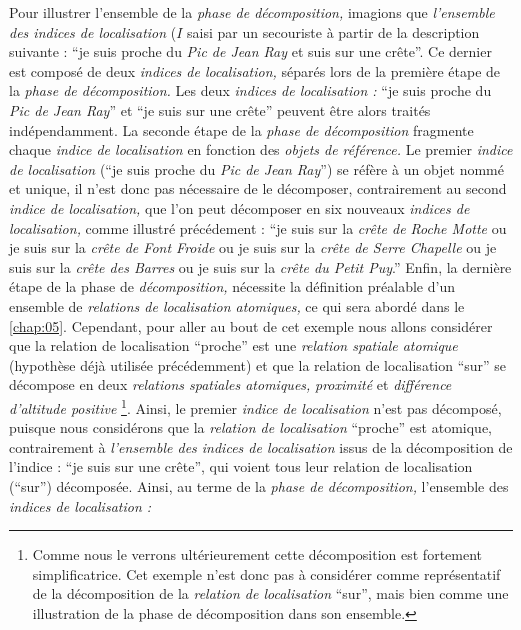 Pour illustrer l'ensemble de la \emph{phase de décomposition,}
imagions que \emph{l'ensemble des indices de localisation} (\(I\)
saisi par un secouriste à partir de la description suivante :
\enquote{je suis proche du \emph{Pic de Jean Ray} et suis sur une
  crête}. Ce dernier est composé de deux \emph{indices de
  localisation,} séparés lors de la première étape de la \emph{phase
  de décomposition.} Les deux \emph{indices de localisation :}
\enquote{je suis proche du \emph{Pic de Jean Ray}} et \enquote{je suis
  sur une crête} peuvent être alors traités indépendamment. La seconde
étape de la \emph{phase de décomposition} fragmente chaque
\emph{indice de localisation} en fonction des \emph{objets de
  référence.} Le premier \emph{indice de localisation} (\enquote{je
  suis proche du \emph{Pic de Jean Ray}}) se réfère à un objet nommé
et unique, il n'est donc pas nécessaire de le décomposer,
contrairement au second \emph{indice de localisation,} que l'on peut
décomposer en six nouveaux \emph{indices de localisation,} comme
illustré précédement : \enquote{je suis sur la \emph{crête de Roche
    Motte} ou je suis sur la \emph{crête de Font Froide} ou je suis
  sur la \emph{crête de Serre Chapelle} ou je suis sur la \emph{crête
    des Barres} ou je suis sur la \emph{crête du Petit Puy}.} Enfin,
la dernière étape de la phase de \emph{décomposition,} nécessite la
définition préalable d'un ensemble de \emph{relations de localisation
  atomiques,} ce qui sera abordé dans le \autoref{chap:05}. Cependant,
pour aller au bout de cet exemple nous allons considérer que la
relation de localisation \enquote{proche} est une \emph{relation
  spatiale atomique} (hypothèse déjà utilisée précédemment) et que la
relation de localisation \enquote{sur} se décompose en deux
\emph{relations spatiales atomiques,} \emph{proximité} et
\emph{différence d'altitude positive} \footnote{Comme nous le verrons
  ultérieurement cette décomposition est fortement
  simplificatrice. Cet exemple n'est donc pas à considérer comme
  représentatif de la décomposition de la \emph{relation de
    localisation} \enquote{sur}, mais bien comme une illustration de
  la phase de décomposition dans son ensemble.}. Ainsi, le premier
\emph{indice de localisation} n'est pas décomposé, puisque nous
considérons que la \emph{relation de localisation} \enquote{proche}
est atomique, contrairement à \emph{l'ensemble des indices de
  localisation} issus de la décomposition de l'indice : \enquote{je
  suis sur une crête}, qui voient tous leur relation de localisation
(\enquote{sur}) décomposée. Ainsi, au terme de la \emph{phase de
  décomposition,} l'ensemble des \emph{indices de localisation :}
